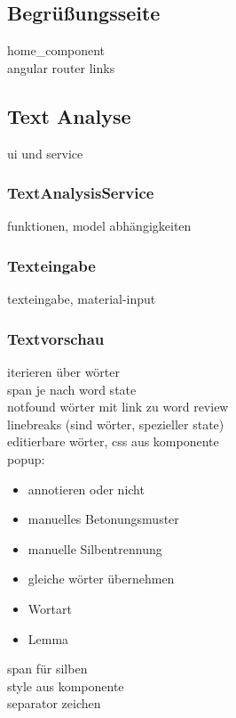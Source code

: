 \subsection{Begrüßungsseite}

home\_component\\
angular router links

\subsection{Text Analyse}

ui und service

\subsubsection{TextAnalysisService}

funktionen, model abhängigkeiten

\subsubsection{Texteingabe}

texteingabe, material-input\\

\subsubsection{Textvorschau}

iterieren über wörter\\
span je nach word state\\
notfound wörter mit link zu word review\\
linebreaks (sind wörter, spezieller state)\\

editierbare wörter, css aus komponente\\
popup:\\
\begin{itemize}
	\item annotieren oder nicht
	\item manuelles Betonungsmuster
	\item manuelle Silbentrennung
	\item gleiche wörter übernehmen
	\item Wortart
	\item Lemma
\end{itemize}

span für silben\\
style aus komponente\\
separator zeichen\\

